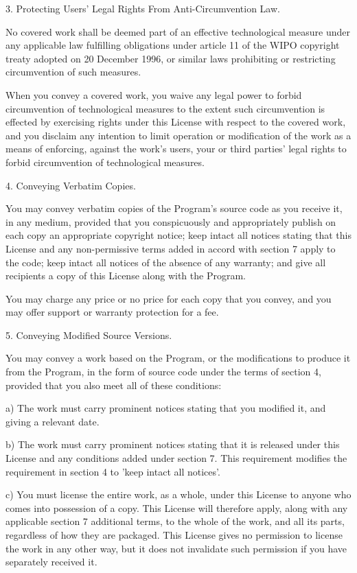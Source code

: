 \documentclass{article}
\begin{document}
  3. Protecting Users' Legal Rights From Anti-Circumvention Law.

  No covered work shall be deemed part of an effective technological
measure under any applicable law fulfilling obligations under article
11 of the WIPO copyright treaty adopted on 20 December 1996, or
similar laws prohibiting or restricting circumvention of such
measures.

  When you convey a covered work, you waive any legal power to forbid
circumvention of technological measures to the extent such circumvention
is effected by exercising rights under this License with respect to
the covered work, and you disclaim any intention to limit operation or
modification of the work as a means of enforcing, against the work's
users, your or third parties' legal rights to forbid circumvention of
technological measures.

  4. Conveying Verbatim Copies.

  You may convey verbatim copies of the Program's source code as you
receive it, in any medium, provided that you conspicuously and
appropriately publish on each copy an appropriate copyright notice;
keep intact all notices stating that this License and any
non-permissive terms added in accord with section 7 apply to the code;
keep intact all notices of the absence of any warranty; and give all
recipients a copy of this License along with the Program.

  You may charge any price or no price for each copy that you convey,
and you may offer support or warranty protection for a fee.

  5. Conveying Modified Source Versions.

  You may convey a work based on the Program, or the modifications to
produce it from the Program, in the form of source code under the
terms of section 4, provided that you also meet all of these conditions:

    a) The work must carry prominent notices stating that you modified
    it, and giving a relevant date.

    b) The work must carry prominent notices stating that it is
    released under this License and any conditions added under section
    7.  This requirement modifies the requirement in section 4 to
    'keep intact all notices'.

    c) You must license the entire work, as a whole, under this
    License to anyone who comes into possession of a copy.  This
    License will therefore apply, along with any applicable section 7
    additional terms, to the whole of the work, and all its parts,
    regardless of how they are packaged.  This License gives no
    permission to license the work in any other way, but it does not
    invalidate such permission if you have separately received it.
\end{document}
